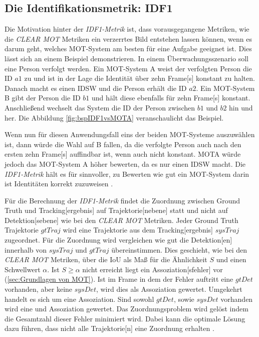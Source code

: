 \subsection{Die Identifikationsmetrik: IDF1}
Die Motivation hinter der \textit{\gls{IDF1}-Metrik} ist, dass vorausgegangene Metriken, wie die \textit{\acrshort{CLEAR} \gls{MOT}} Metriken ein verzerrtes Bild entstehen lassen können, wenn es darum geht, welches \gls{MOT}-System am besten für eine Aufgabe geeignet ist. Dies lässt sich an einem Beispiel demonstrieren. In einem Überwachungsszenario soll eine Person verfolgt werden. Ein \gls{MOT}-System A weist der verfolgten Person die \acrshort{ID} \(a1\) zu und ist in der Lage die Identität über zehn \gls{Frame}[s] konstant zu halten. Danach macht es einen \gls{IDSW} und die Person erhält die \acrshort{ID} \(a2\). Ein \gls{MOT}-System B gibt der Person die \acrshort{ID} \(b1\) und hält diese ebenfalls für zehn \gls{Frame}[s] konstant. Anschließend wechselt das System die \acrshort{ID} der Person zwischen \(b1\) und \(b2\) hin und her. Die Abbildung \ref{fig:bspIDF1vsMOTA} veranschaulicht das Beispiel.


Wenn nun für diesen Anwendungsfall eins der beiden \gls{MOT}-Systeme auszuwählen ist, dann würde die Wahl auf B fallen, da die verfolgte Person auch nach den ersten zehn \gls{Frame}[s] auffindbar ist, wenn auch nicht konstant. \gls{MOTA} würde jedoch das \gls{MOT}-System A höher bewerten, da es nur einen \gls{IDSW} macht. Die \textit{\gls{IDF1}-Metrik} hält es für sinnvoller, zu Bewerten wie gut ein \gls{MOT}-System darin ist Identitäten korrekt zuzuweisen \cite{IDF1}. \par

Für die Berechnung der \textit{\gls{IDF1}-Metrik} findet die Zuordnung zwischen \gls{Ground Truth} und \gls{Tracking}[ergebnis] auf \gls{Trajektorie}[nebene] statt und nicht auf \gls{Detektion}[sebene] wie bei den \textit{\acrshort{CLEAR} \gls{MOT}} Metriken. Jeder \gls{Ground Truth} \gls{Trajektorie} \(gtTraj\) wird eine \gls{Trajektorie} aus dem \gls{Tracking}[ergebnis] \(sysTraj\) zugeordnet. Für die Zuordnung wird vergleichen wie gut die \gls{Detektion}[en] innerhalb von \(sysTraj\) und \(gtTraj\) übereinstimmen. Dies geschieht, wie bei den \textit{\acrshort{CLEAR} \gls{MOT}} Metriken, über die \gls{IoU} als Maß für die Ähnlichkeit \(S\) und einen Schwellwert \(\alpha\). Ist \(S \geq \alpha\) nicht erreicht liegt ein \gls{Assoziation}[sfehler] vor (\ref{sec:Grundlagen von MOT}). Ist im \gls{Frame} in dem der Fehler auftritt eine \(gtDet\) vorhanden, aber keine \(sysDet\), wird dies als  \gls{Assoziation} gewertet. Umgekehrt handelt es sich um eine  \gls{Assoziation}. Sind sowohl \(gtDet\), sowie \(sysDet\) vorhanden wird eine  und  \gls{Assoziation} gewertet. Das Zuordnungsproblem wird gelöst indem die Gesamtzahl dieser Fehler minimiert wird. Dabei kann die optimale Lösung dazu führen, dass nicht alle \gls{Trajektorie}[n] eine Zuordnung erhalten \cite{IDF1}. \par

